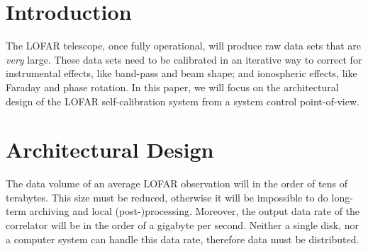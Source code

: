 \documentclass[11pt,twoside]{article}  %
\begin{document}
%
%

\section{Introduction}
The LOFAR telescope, once fully operational, will produce raw data sets that
are \emph{very} large.  These data sets need to be calibrated in an iterative
way to correct for instrumental effects, like band-pass and beam shape; and
ionospheric effects, like Faraday and phase rotation. In this paper, we will
focus on the architectural design of the LOFAR self-calibration system from a
system control point-of-view.

\section{Architectural Design}
The data volume of an average LOFAR observation will in the order of tens of
terabytes. This size must be reduced, otherwise it will be impossible to do
long-term archiving and local (post-)processing. Moreover, the output data
rate of the correlator will be in the order of a gigabyte per second. Neither
a single disk, nor a computer system can handle this data rate, therefore data
must be distributed.
\end{document}
